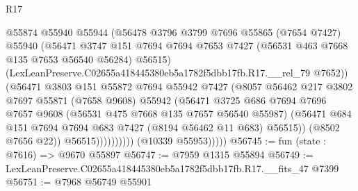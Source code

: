 \begin{lexlean}{R17}
\begin{coremodule}
                              @55874
                              @55940
                              @55944
                              (@56478
                                @3796
                                @3799
                                @7696
                                @55865
                                (@7654 @7427)
                                @55940
                                (@56471
                                  @3747
                                  @151
                                  @7694
                                  @7694
                                  @7653
                                  @7427
                                  (@56531 @463 @7668 @135 @7653 @56540 @56284)
                                  @56515)
                                (LexLeanPreserve.C02655a418445380eb5a1782f5dbb17fb.R17.__rel_79
                                  @7652))
                              (@56471
                                @3803
                                @151
                                @55872
                                @7694
                                @55942
                                @7427
                                (@8057
                                  @56462
                                  @217
                                  @3802
                                  @7697
                                  @55871
                                  (@7658 @9608)
                                  @55942
                                  (@56471
                                    @3725
                                    @686
                                    @7694
                                    @7696
                                    @7657
                                    @9608
                                    (@56531 @475 @7668 @135 @7657 @56540 @55987)
                                    (@56471
                                      @684
                                      @151
                                      @7694
                                      @7694
                                      @683
                                      @7427
                                      (@8194 @56462 @11 @683)
                                      @56515))
                                  (@8502 @7656 @22))
                                @56515))))))))))
            (@10339 @55953)))))
@56745 := fun (state : @7616) => @9670 @55897
@56747 := @7959 @1315 @55894
@56749 := LexLeanPreserve.C02655a418445380eb5a1782f5dbb17fb.R17.__fits_47 @7399
@56751 := @7968 @56749 @55901

\end{coremodule}
\end{lexlean}
